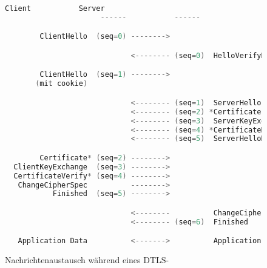 \begin{figure}[ht]
  \centering
  \begin{lstlisting}[language=c]
                      Client           Server
                      ------           ------

        ClientHello  (seq=0) -------->

                             <-------- (seq=0)  HelloVerifyRequest    // Nur bei DTLS

        ClientHello  (seq=1) -------->                                // Nur bei DTLS
       (mit cookie)                                                   // Nur bei DTLS

                             <-------- (seq=1)  ServerHello
                             <-------- (seq=2) *Certificate
                             <-------- (seq=3)  ServerKeyExchange
                             <-------- (seq=4) *CertificateRequest
                             <-------- (seq=5)  ServerHelloDone

        Certificate* (seq=2) -------->
  ClientKeyExchange  (seq=3) -------->
  CertificateVerify* (seq=4) -------->
   ChangeCipherSpec          -------->
           Finished  (seq=5) -------->

                             <--------          ChangeCipherSpec
                             <-------- (seq=6)  Finished  

   Application Data          <------->          Application Data
  \end{lstlisting}
  \caption{Nachrichtenaustausch während eines DTLS-}
  \label{fig:handshake}
\end{figure}

